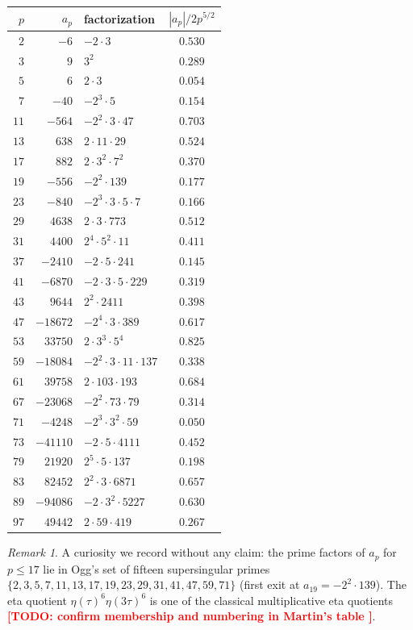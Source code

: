 \documentclass[11pt,reqno]{amsart}
\theoremstyle{plain}
\theoremstyle{definition}
\theoremstyle{remark}
\newtheorem{remark}[theorem]{Remark}
\newcommand{\TODO}[1]{\textcolor{red}{\textbf{[TODO: #1]}}}
\begin{document}
\begin{center}
\small
\begin{tabular}{rrlc}
\toprule
$p$ & $a_p$ & factorization & $|a_p|/2p^{5/2}$ \\
\midrule
$2$ & $-6$ & $-2\cdot3$ & $0.530$ \\
$3$ & $9$ & $3^2$ & $0.289$ \\
$5$ & $6$ & $2\cdot3$ & $0.054$ \\
$7$ & $-40$ & $-2^3\cdot5$ & $0.154$ \\
$11$ & $-564$ & $-2^2\cdot3\cdot47$ & $0.703$ \\
$13$ & $638$ & $2\cdot11\cdot29$ & $0.524$ \\
$17$ & $882$ & $2\cdot3^2\cdot7^2$ & $0.370$ \\
$19$ & $-556$ & $-2^2\cdot139$ & $0.177$ \\
$23$ & $-840$ & $-2^3\cdot3\cdot5\cdot7$ & $0.166$ \\
$29$ & $4638$ & $2\cdot3\cdot773$ & $0.512$ \\
$31$ & $4400$ & $2^4\cdot5^2\cdot11$ & $0.411$ \\
$37$ & $-2410$ & $-2\cdot5\cdot241$ & $0.145$ \\
$41$ & $-6870$ & $-2\cdot3\cdot5\cdot229$ & $0.319$ \\
$43$ & $9644$ & $2^2\cdot2411$ & $0.398$ \\
$47$ & $-18672$ & $-2^4\cdot3\cdot389$ & $0.617$ \\
$53$ & $33750$ & $2\cdot3^3\cdot5^4$ & $0.825$ \\
$59$ & $-18084$ & $-2^2\cdot3\cdot11\cdot137$ & $0.338$ \\
$61$ & $39758$ & $2\cdot103\cdot193$ & $0.684$ \\
$67$ & $-23068$ & $-2^2\cdot73\cdot79$ & $0.314$ \\
$71$ & $-4248$ & $-2^3\cdot3^2\cdot59$ & $0.050$ \\
$73$ & $-41110$ & $-2\cdot5\cdot4111$ & $0.452$ \\
$79$ & $21920$ & $2^5\cdot5\cdot137$ & $0.198$ \\
$83$ & $82452$ & $2^2\cdot3\cdot6871$ & $0.657$ \\
$89$ & $-94086$ & $-2\cdot3^2\cdot5227$ & $0.630$ \\
$97$ & $49442$ & $2\cdot59\cdot419$ & $0.267$ \\
\bottomrule
\end{tabular}
\end{center}

\begin{remark}
A curiosity we record without any claim: the prime factors of $a_p$
for $p\le17$ lie in Ogg's set of fifteen supersingular primes
$\{2,3,5,7,11,13,17,19,23,29,31,41,47,59,71\}$ (first exit at
$a_{19}=-2^2\cdot139$).  The eta quotient $\eta(\tau)^6\eta(3\tau)^6$
is one of the classical multiplicative eta quotients
\TODO{confirm membership and numbering in Martin's table
\cite{Martin1996}}.
\end{remark}
\end{document}
